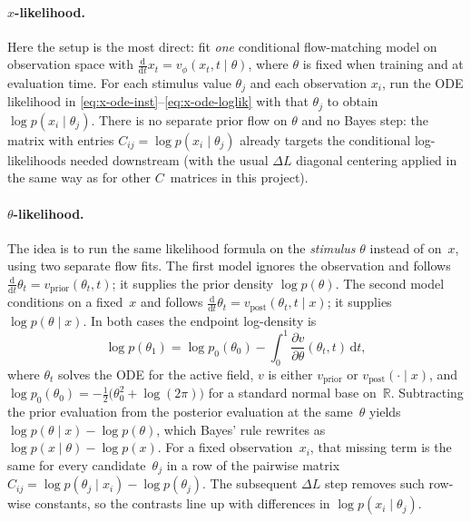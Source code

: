 \paragraph{$x$-likelihood.}
Here the setup is the most direct: fit \emph{one} conditional flow-matching model on observation space with $\frac{\mathrm{d}}{\mathrm{d}t}x_t = v_{\phi}(x_t,t\mid\theta)$, where $\theta$ is fixed when training and at evaluation time.
For each stimulus value $\theta_j$ and each observation $x_i$, run the ODE likelihood in \eqref{eq:x-ode-inst}--\eqref{eq:x-ode-loglik} with that $\theta_j$ to obtain $\log p(x_i\mid\theta_j)$.
There is no separate prior flow on $\theta$ and no Bayes step: the matrix with entries $C_{ij}=\log p(x_i\mid\theta_j)$ already targets the conditional log-likelihoods needed downstream (with the usual $\Delta L$ diagonal centering applied in the same way as for other $C$~matrices in this project).

\paragraph{$\theta$-likelihood.}
The idea is to run the same likelihood formula on the \emph{stimulus} $\theta$ instead of on~$x$, using two separate flow fits.
The first model ignores the observation and follows $\frac{\mathrm{d}}{\mathrm{d}t}\theta_t = v_{\mathrm{prior}}(\theta_t,t)$; it supplies the prior density $\log p(\theta)$.
The second model conditions on a fixed~$x$ and follows $\frac{\mathrm{d}}{\mathrm{d}t}\theta_t = v_{\mathrm{post}}(\theta_t,t\mid x)$; it supplies $\log p(\theta\mid x)$.
In both cases the endpoint log-density is
\begin{equation}
  \label{eq:theta-ode-loglik}
  \log p(\theta_1)
  =
  \log p_0(\theta_0)
  -
  \int_0^1 \frac{\partial v}{\partial \theta}(\theta_t,t)\,\mathrm{d}t,
\end{equation}
where $\theta_t$ solves the ODE for the active field, $v$ is either $v_{\mathrm{prior}}$ or $v_{\mathrm{post}}(\cdot\mid x)$, and $\log p_0(\theta_0)= -\tfrac{1}{2}\bigl(\theta_0^2 + \log(2\pi)\bigr)$ for a standard normal base on~$\mathbb{R}$.
Subtracting the prior evaluation from the posterior evaluation at the same~$\theta$ yields $\log p(\theta\mid x)-\log p(\theta)$, which Bayes' rule rewrites as $\log p(x\mid\theta)-\log p(x)$.
For a fixed observation~$x_i$, that missing term is the same for every candidate~$\theta_j$ in a row of the pairwise matrix $C_{ij}=\log p(\theta_j\mid x_i)-\log p(\theta_j)$.
The subsequent $\Delta L$ step removes such row-wise constants, so the contrasts line up with differences in $\log p(x_i\mid\theta_j)$.

